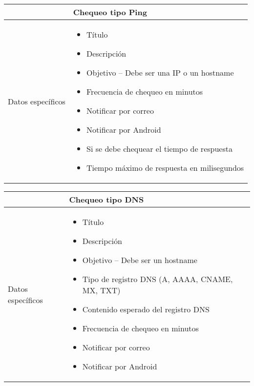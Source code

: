 \begin{center}
  
  \begin{tabularx}{\textwidth}{|l|X|}
    \hline

    & Chequeo tipo Ping \\

    \hline
    Datos específicos &

    \begin{itemize}
      \item Título 
      \item Descripción
      \item Objetivo -- Debe ser una IP o un hostname
      \item Frecuencia de chequeo en minutos
      \item Notificar por correo
      \item Notificar por Android
      \item Si se debe chequear el tiempo de respuesta
      \item Tiempo máximo de respuesta en milisegundos
    \end{itemize}
    \\
    
    \hline
    
  \end{tabularx}
\end{center}

\begin{center}
  
  \begin{tabularx}{\textwidth}{|l|X|}
    \hline

    & Chequeo tipo DNS \\

    \hline
    Datos específicos &

    \begin{itemize}
      \item Título 
      \item Descripción
      \item Objetivo -- Debe ser un hostname
      \item Tipo de registro DNS (A, AAAA, CNAME, MX, TXT)
      \item Contenido esperado del registro DNS
      \item Frecuencia de chequeo en minutos
      \item Notificar por correo
      \item Notificar por Android
    \end{itemize}
    \\
    
    \hline
    
  \end{tabularx}
\end{center}

